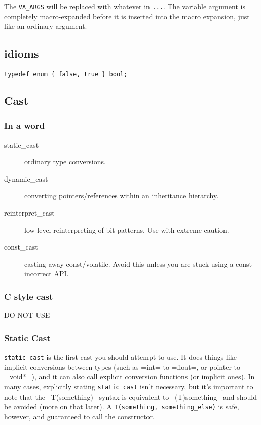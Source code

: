 The \verb$VA_ARGS$ will be replaced with whatever in \verb$...$.
The variable argument is completely macro-expanded before it is inserted into the macro expansion,
just like an ordinary argument.

\subsection{idioms}
\begin{lstlisting}
typedef enum { false, true } bool;
\end{lstlisting}

\subsection{Cast}

\subsubsection{In a word}
\begin{description}
\item [static\_cast] ordinary type conversions.
\item [dynamic\_cast] converting pointers/references within an
  inheritance hierarchy.
\item [reinterpret\_cast] low-level reinterpreting of bit patterns.
  Use with extreme caution.
\item [const\_cast] casting away const/volatile.  Avoid this unless you
  are stuck using a const-incorrect API.
\end{description}

\subsubsection{C style cast}
DO NOT USE

\subsubsection{Static Cast}
\verb$static_cast$ is the first cast you should attempt to use.  It does
things like implicit conversions between types (such as =int= to
=float=, or pointer to =void*=), and it can also call explicit
conversion functions (or implicit ones).  In many cases, explicitly
stating \verb$static_cast$ isn't necessary, but it's important to note that
the ~T(something)~ syntax is equivalent to ~(T)something~ and should
be avoided (more on that later).  A \verb$T(something, something_else)$ is
safe, however, and guaranteed to call the constructor.

